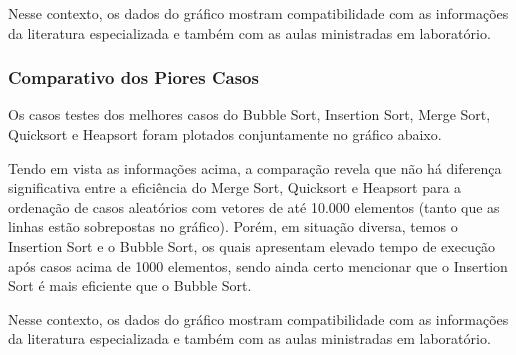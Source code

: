 \documentclass[a4paper, 12pt]{article}
\begin{document}
Nesse contexto, os dados do gráfico mostram compatibilidade com as informações da literatura especializada e também com as aulas ministradas em laboratório.

\subsubsection{Comparativo dos Piores Casos}

\tab{ }Os casos testes dos melhores casos do Bubble Sort, Insertion Sort, Merge Sort, Quicksort e Heapsort foram plotados conjuntamente no gráfico abaixo.
\begin{center}
\end{center}


\vspace{0.8cm}
Tendo em vista as informações acima, a comparação revela que não há diferença significativa entre a eficiência do Merge Sort, Quicksort e Heapsort para a ordenação de casos aleatórios com vetores de até 10.000 elementos (tanto que as linhas estão sobrepostas no gráfico). Porém, em situação diversa, temos o Insertion Sort e o Bubble Sort, os quais apresentam elevado tempo de execução após casos acima de 1000 elementos, sendo ainda certo mencionar que o Insertion Sort é mais eficiente que o Bubble Sort.

Nesse contexto, os dados do gráfico mostram compatibilidade com as informações da literatura especializada e também com as aulas ministradas em laboratório.
\end{document}
